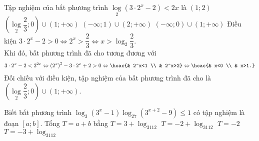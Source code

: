 \begin{ex}%
	Tập nghiệm của bất phương trình $\log\limits_2\left(3\cdot 2^x-2\right)<2x$ là 
	\choice
	{$(1;2)$}
	{\True $\left(\log\limits_2\dfrac{2}{3};0\right)\cup (1;+\infty)$}
	{$(-\infty;1)\cup (2;+\infty)$}
	{$(-\infty;0)\cup (1;+\infty)$}
	\loigiai
	{Điều kiện $3\cdot 2^x-2>0\Leftrightarrow 2^x>\dfrac{2}{3}\Leftrightarrow x>\log_2 \dfrac{2}{3}$.\\
		Khi đó, bất phương trình đã cho tương đương với
		$$
		3\cdot 2^x -2<2^{2x}\Leftrightarrow  \left(2^x\right)^2-3\cdot 2^x+2>0\Leftrightarrow\hoac{& 2^x<1 \\ & 2^x>2}\Leftrightarrow\hoac{& x<0 \\ & x>1.}$$
		Đối chiếu với điều kiện, tập nghiệm của bất phương trình đã cho là $\left(\log\limits_2\dfrac{2}{3};0\right)\cup (1;+\infty)$.
	}
\end{ex}


\begin{ex}%
	Biết bất phương trình $\log_3\left(3^x-1\right)\log_{27}\left(3^{x+2}-9\right)\le1$ có tập nghiệm là đoạn $[a;b]$. Tổng $T=a+b$ bằng
	\choice
	{$T=3+\log_3112$}
	{$T=-2+\log_3112$}
	{$T=-2$}
	{\True $T=-3+\log_3112$}
\end{ex}




